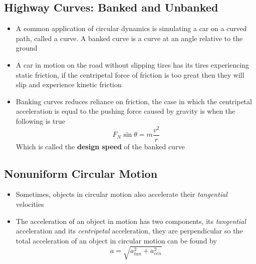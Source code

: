 \subsection{Highway Curves: Banked and Unbanked}
\begin{itemize}
    \item A common application of circular dynamics is simulating a car on a curved path, called a curve. A banked curve is a curve at an angle relative to the ground
    \item A car in motion on the road without slipping tires has its tires experiencing static friction, if the centripetal force of friction is too great then they will slip and experience kinetic friction 
    \item Banking curves reduces reliance on friction, the case in which the centripetal acceleration is equal to the pushing force caused by gravity is when the following is true
    \[F_N\sin\theta=m\frac{v^2}{r}\] Which is called the \textbf{design speed} of the banked curve
\end{itemize}

\subsection{Nonuniform Circular Motion}
\begin{itemize}
    \item Sometimes, objects in circular motion also accelerate their \emph{tangential} velocities
    \item The acceleration of an object in motion has two components, its \emph{tangential} acceleration and its \emph{centripetal} acceleration, they are perpendicular so the total acceleration of an object in circular motion can be found by \[a=\sqrt{a_{tan}^2+a_{cen}^2}\]
\end{itemize}

